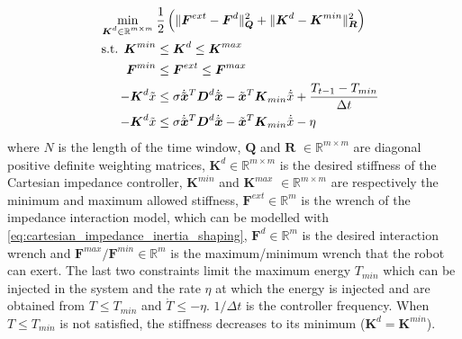 \begin{align}
    \min_{\substack{\boldsymbol{K}^d \in \mathbb{R}^{m \times m} }} \: & \frac{1}{2} \left( \| \boldsymbol{F}^{ext} - \boldsymbol{F}^{d} \|_{\boldsymbol{Q}}^2 + \| \boldsymbol{K}^{d} - \boldsymbol{K}^{min} \|_{\boldsymbol{R}}^2 \right) \nonumber \\ 
    \quad  \text{s.t.   } \boldsymbol{K}^{min} &\le \boldsymbol{K}^d \le \boldsymbol{K}^{max} \nonumber \\
    \boldsymbol{F}^{min} &\le \boldsymbol{F}^{ext} \le \boldsymbol{F}^{max} \label{eq:general_QP_formulation} \\
    - \boldsymbol{K}^d \Tilde{x} &\leq \sigma \dot{\Tilde{\boldsymbol{x}}}^T \boldsymbol{D}^d \dot{\Tilde{\boldsymbol{x}}} - \Tilde{\boldsymbol{x}}^T 
    \boldsymbol{K}_{min} \dot{\Tilde{x}} + \frac{ T_{t-1} - T_{min}}{\Delta t} \nonumber \\
    - \boldsymbol{K}^d \Tilde{x} &\leq \sigma \dot{\Tilde{\boldsymbol{x}}}^T \boldsymbol{D}^d \dot{\Tilde{\boldsymbol{x}}} - \Tilde{\boldsymbol{x}}^T 
    \boldsymbol{K}_{min} \dot{\Tilde{x}} - \eta \nonumber
\end{align}
where $N$ is the length of the time window, $\boldsymbol{Q}$ and $\boldsymbol{R}$ $\in \mathbb{R}^{m\times m}$ are diagonal positive definite weighting matrices, $\boldsymbol{K}^d \in \mathbb{R}^{m\times m}$ is the desired stiffness of the Cartesian impedance controller, $\boldsymbol{K}^{min}$ and $\boldsymbol{K}^{max}$ $\in \mathbb{R}^{m\times m}$ are respectively the minimum and maximum allowed stiffness, $\boldsymbol{F}^{ext} \in \mathbb{R}^{m}$ is the wrench of the impedance interaction model, which can be modelled with \eqref{eq:cartesian_impedance_inertia_shaping}, $\boldsymbol{F}^d \in \mathbb{R}^{m}$ is the desired interaction wrench and $\boldsymbol{F}^{max}/\boldsymbol{F}^{min} \in \mathbb{R}^{m}$ is the maximum/minimum wrench that the robot can exert. %
The last two constraints limit the maximum energy $T_{min}$ which can be injected in the system and the rate $\eta$ at which the energy is injected and are obtained from $T \le T_{min}$ and $\dot{T} \le -\eta$. 
$1/\Delta t$ is the controller frequency. 
When $T \le T_{min}$ is not satisfied, the stiffness decreases to its minimum ($\boldsymbol{K}^d = \boldsymbol{K}^{min}$). 



